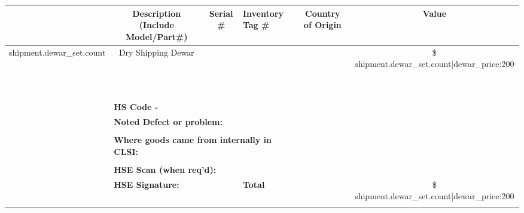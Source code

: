 \documentclass[letterpaper,10pt]{report}
\begin{document}
\begin{center}
{{{\begin{center}
{\begin{tabular}{|l|l|c|c|l|l|c|c|l|c|c|c|}
{{{{{{\multicolumn{1}{|c}{ {\footnotesize {\bf  QTY} } } & 
\multicolumn{5}{|c|}{ {\footnotesize {\bf  Description (Include Model/Part\#)} } } & 
\multicolumn{2}{c|}{ {\footnotesize {\bf  Serial \#} } } & 
 {\footnotesize {\bf  Inventory Tag \# } } & 
 {\footnotesize {\bf  Country of Origin } }& 
\multicolumn{2}{c|}{ {\bf Value} } \\ \hline    
\multicolumn{1}{|c}{ {{shipment.dewar_set.count }} } & \multicolumn{5}{|c|}{Dry Shipping Dewar} & \multicolumn{2}{c|}{} &  &  & \multicolumn{2}{c|}{ \${{ shipment.dewar_set.count|dewar_price:200 }} } \\ \hline
\multicolumn{1}{|c}{} & \multicolumn{5}{|c|}{} & \multicolumn{2}{c|}{} &  &  & \multicolumn{2}{c|}{} \\ \hline
\multicolumn{1}{|c}{} & \multicolumn{5}{|c|}{} & \multicolumn{2}{c|}{} &  &  & \multicolumn{2}{c|}{} \\ \hline
\multicolumn{1}{|c}{} & \multicolumn{5}{|c|}{} & \multicolumn{2}{c|}{} &  &  & \multicolumn{2}{c|}{} \\ \hline
\multicolumn{1}{|c}{} & \multicolumn{5}{|c|}{} & \multicolumn{2}{c|}{} &  &  & \multicolumn{2}{c|}{} \\ \hline
\multicolumn{1}{|c}{} & \multicolumn{5}{|c|}{} & \multicolumn{2}{c|}{} &  &  & \multicolumn{2}{c|}{} \\ \hline
\multicolumn{1}{|c}{} & \multicolumn{5}{|c|}{} & \multicolumn{2}{c|}{} &  &  & \multicolumn{2}{c|}{} \\ \hline
\multicolumn{1}{|c}{} & \multicolumn{5}{|c|}{} & \multicolumn{2}{c|}{} &  &  & \multicolumn{2}{c|}{} \\ \hline
\multicolumn{1}{|c}{} & \multicolumn{5}{|c|}{} & \multicolumn{2}{c|}{} &  &  & \multicolumn{2}{c|}{} \\ \hline
\multicolumn{1}{|c}{} & \multicolumn{5}{|c|}{} & \multicolumn{2}{c|}{} &  &  & \multicolumn{2}{c|}{} \\ \hline
\multicolumn{1}{|c}{} & \multicolumn{8}{|l|}{ {\bf HS Code -} } &  & \multicolumn{2}{c|}{} \\ \hline
\multicolumn{1}{|c}{} & \multicolumn{8}{|l|}{ {\bf Noted Defect or problem: } } &  & \multicolumn{2}{c|}{} \\ \hline
\multicolumn{1}{|c}{} & \multicolumn{8}{|l|}{} &  & \multicolumn{2}{c|}{} \\ \hline
\multicolumn{1}{|c}{} & \multicolumn{8}{|l|}{ {\bf Where goods came from internally in CLSI: } } &  & \multicolumn{2}{c|}{} \\ \hline
\multicolumn{1}{|c}{} & \multicolumn{8}{|l|}{} &  & \multicolumn{2}{c|}{} \\ \hline
\multicolumn{1}{|c}{} & \multicolumn{8}{|l|}{ {\bf HSE Scan (when req'd):} } &  & \multicolumn{2}{c|}{} \\ \hline
\multicolumn{1}{|c}{} & \multicolumn{7}{|l}{ {\bf HSE Signature: } }& \multicolumn{1}{l|}{ {\bf Total} } &  & \multicolumn{2}{c|}{ \${{ shipment.dewar_set.count|dewar_price:200 }} } \\ \hline \hline

}}}}}}
\end{tabular}}
\end{center}}}}
\end{center}
\end{document}
